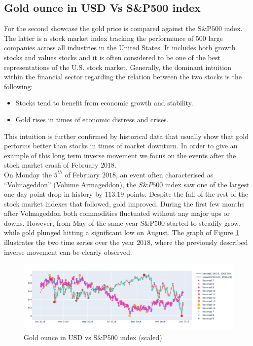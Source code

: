 \documentclass[a4, 11pt]{article}
\begin{document}
\subsection{Gold ounce in USD Vs S\&P500 index}
For the second showcase the gold price is compared against the S$\&$P$500$ index. The latter is a stock market index tracking the performance of $500$ large companies across all industries in the United States. It includes both growth stocks and values stocks and it is often considered to be one of the best representations of the U.S. stock market. Generally, the dominant intuition within the financial sector regarding the relation between the two stocks is the following: 
\begin{itemize}
    \item Stocks tend to benefit from economic growth and stability.
    \item Gold rises in times of economic distress and crises.
\end{itemize}
This intuition is further confirmed by historical data that usually show that gold performs better than stocks in times of market downturn. In order to give an example of this long term inverse movement we focus on the events after the stock market crash of February $2018$.\\[2ex]
On Monday the $5^{th}$ of February $2018$, an event often characterised as “Volmageddon” (Volume Armageddon), the $S\&P500$ index saw one of the largest one-day point drop in history by $113.19$ points. Despite the fall of the rest of the stock market indexes that followed, gold improved. During the first few months after Volmageddon both commodities fluctuated without any major ups or downs. However, from May of the same year S$\&$P$500$ started to steadily grow, while gold plunged hitting a significant low on August. The graph of Figure \ref{fig:GoldSP500Scalled} illustrates the two time series over the year $2018$, where the previously described inverse movement can be clearly observed. 
\begin{figure}[!ht]
    \centering
    \includegraphics[width=1.05\textwidth]{Images/GoldSP500.png}
    \caption{Gold ounce in USD vs S$\&$P500 index  (scaled)}
    \label{fig:GoldSP500Scalled}
\end{figure}
\end{document}
